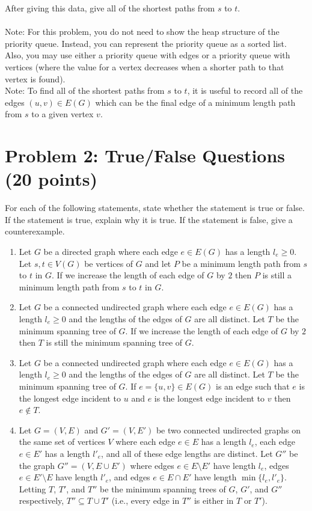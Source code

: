 \documentclass[12pt]{article}
\begin{document}
After giving this data, give all of the shortest paths from $s$ to $t$.\\
\\
Note: For this problem, you do not need to show the heap structure of the priority queue. Instead, you can represent the priority queue as a sorted list. Also, you may use either a priority queue with edges or a priority queue with vertices (where the value for a vertex decreases when a shorter path to that vertex is found).\\ 
Note: To find all of the shortest paths from $s$ to $t$, it is useful to record all of the edges $(u,v) \in E(G)$ which can be the final edge of a minimum length path from $s$ to a given vertex $v$.
\section*{Problem 2: True/False Questions (20 points)}
For each of the following statements, state whether the statement is true or false. If the statement is true, explain why it is true. If the statement is false, give a counterexample.
\begin{enumerate}
\item [(a)] Let $G$ be a directed graph where each edge $e \in E(G)$ has a length $l_e \geq 0$. Let $s,t \in V(G)$ be vertices of $G$ and let $P$ be a minimum length path from $s$ to $t$ in $G$. If we increase the length of each edge of $G$ by $2$ then $P$ is still a minimum length path from $s$ to $t$ in $G$.
\item [(b)] Let $G$ be a connected undirected graph where each edge $e \in E(G)$ has a length $l_e \geq 0$ and the lengths of the edges of $G$ are all distinct. Let $T$ be the minimum spanning tree of $G$. If we increase the length of each edge of $G$ by $2$ then $T$ is still the minimum spanning tree of $G$.
\item [(c)] Let $G$ be a connected undirected graph where each edge $e \in E(G)$ has a length $l_e \geq 0$ and the lengths of the edges of $G$ are all distinct. Let $T$ be the minimum spanning tree of $G$. If $e = \{u,v\} \in E(G)$ is an edge such that $e$ is the longest edge incident to $u$ and $e$ is the longest edge incident to $v$ then $e \notin T$.
\item [(d)] Let $G = (V,E)$ and $G' = (V,E')$ be two connected undirected graphs on the same set of vertices $V$ where each edge $e \in E$ has a length $l_e$, each edge $e \in E'$ has a length $l'_e$, and all of these edge lengths are distinct. Let $G''$ be the graph $G'' = (V,E \cup E')$ where edges $e \in E \setminus E'$ have length $l_e$, edges $e \in E' \setminus E$ have length $l'_e$, and edges $e \in E \cap E'$ have length $\min{\{l_e,l'_e\}}$. Letting $T$, $T'$, and $T''$ be the minimum spanning trees of $G$, $G'$, and $G''$ respectively, $T'' \subseteq T \cup T'$ (i.e., every edge in $T''$ is either in $T$ or $T'$).
\end{enumerate}
\end{document}
